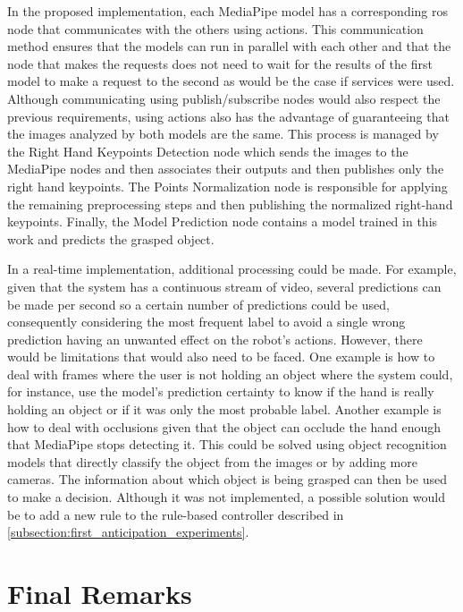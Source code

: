 In the proposed implementation, each MediaPipe model has a corresponding \acs{ros} node that communicates with the others using actions. This communication method ensures that the models can run in parallel with each other and that the node that makes the requests does not need to wait for the results of the first model to make a request to the second as would be the case if services were used. Although communicating using publish/subscribe nodes would also respect the previous requirements, using actions also has the advantage of guaranteeing that the images analyzed by both models are the same. This process is managed by the Right Hand Keypoints Detection node which sends the images to the MediaPipe nodes and then associates their outputs and then publishes only the right hand keypoints. The Points Normalization node is responsible for applying the remaining preprocessing steps and then publishing the normalized right-hand keypoints. Finally, the Model Prediction node contains a model trained in this work and predicts the grasped object.

In a real-time implementation, additional processing could be made. For example, given that the system has a continuous stream of video, several predictions can be made per second so a certain number of predictions could be used, consequently considering the most frequent label to avoid a single wrong prediction having an unwanted effect on the robot's actions. However, there would be limitations that would also need to be faced. One example is how to deal with frames where the user is not holding an object where the system could, for instance, use the model's prediction certainty to know if the hand is really holding an object or if it was only the most probable label. Another example is how to deal with occlusions given that the object can occlude the hand enough that MediaPipe stops detecting it. This could be solved using object recognition models that directly classify the object from the images or by adding more cameras. The information about which object is being grasped can then be used to make a decision. Although it was not implemented, a possible solution would be to add a new rule to the rule-based controller described in \autoref{subsection:first_anticipation_experiments}.

\section{Final Remarks}
\label{section:learning_final_remarks}

